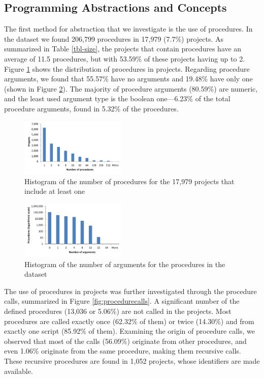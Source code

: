 \documentclass{sig-alternate}
\begin{document}
\subsection{Programming Abstractions and Concepts}
\label{RQ2}
The first method for abstraction that we investigate is the use of procedures. In the dataset we found 206,799 procedures in 17,979 (7.7\%) projects. As summarized in Table \ref{tbl-size}, the projects that contain procedures have an average of 11.5 procedures, but with 53.59\% of these projects having up to 2. Figure \ref{fig:proceduresperproject} shows the distribution of procedures in projects. Regarding procedure arguments, we found that 55.57\% have no arguments and 19.48\% have only one (shown in Figure \ref{fig:procedurearguments}). The majority of procedure arguments (80.59\%) are numeric, and the least used argument type is the boolean one---6.23\% of the total procedure arguments, found in 5.32\% of the procedures.

\begin{figure}
	\centering
	\includegraphics[width=0.45\textwidth]{fig/charts/6proceduresperproject}
	\caption{Histogram of the number of procedures for the 17,979 projects that include at least one}
	\label{fig:proceduresperproject}
\end{figure}

\begin{figure}
	\centering
	\includegraphics[width=0.45\textwidth]{fig/charts/5arguments}
	\caption{Histogram of the number of arguments for the procedures in the dataset}
	\label{fig:procedurearguments}
\end{figure}

The use of procedures in projects was further investigated through the procedure calls, summarized in Figure \ref{fig:procedurecalls}. A significant number of the defined procedures (13,036 or 5.06\%) are not called in the projects. Most procedures are called exactly once (62.32\% of them) or twice (14.30\%) and from exactly one script (85.92\% of them). Examining the origin of procedure calls, we observed that most of the calls (56.09\%) originate from other procedures, and even 1.06\% originate from the same procedure, making them recursive calls. These recursive procedures are found in 1,052 projects, whose identifiers are made available.\footnotemark[\ref{repo}]
\end{document}

